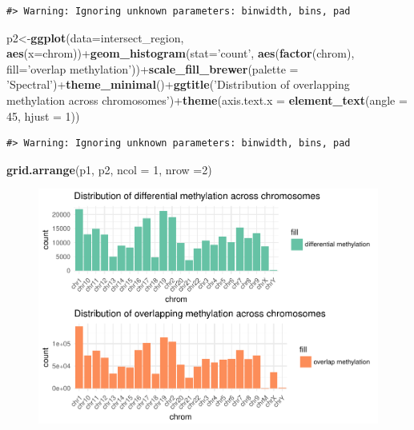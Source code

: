 \documentclass[9pt,a4paper]{extarticle}
\renewcommand{\KeywordTok}[1]{\textbf{{#1}}}
\renewcommand{\DataTypeTok}[1]{\textcolor[rgb]{0.50,0.00,0.00}{{#1}}}
\renewcommand{\DecValTok}[1]{\textcolor[rgb]{0.00,0.00,1.00}{{#1}}}
\renewcommand{\StringTok}[1]{\textcolor[rgb]{0.87,0.00,0.00}{{#1}}}
\renewcommand{\NormalTok}[1]{{#1}}
\begin{document}
\begin{verbatim}
#> Warning: Ignoring unknown parameters: binwidth, bins, pad
\end{verbatim}

\begin{Shaded}
\begin{Highlighting}[]
\NormalTok{p2<-}\KeywordTok{ggplot}\NormalTok{(}\DataTypeTok{data=}\NormalTok{intersect_region, }\KeywordTok{aes}\NormalTok{(}\DataTypeTok{x=}\NormalTok{chrom))+}\KeywordTok{geom_histogram}\NormalTok{(}\DataTypeTok{stat=}\StringTok{'count'}\NormalTok{, }\KeywordTok{aes}\NormalTok{(}\KeywordTok{factor}\NormalTok{(chrom), }\DataTypeTok{fill=}\StringTok{'overlap methylation'}\NormalTok{))+}\KeywordTok{scale_fill_brewer}\NormalTok{(}\DataTypeTok{palette =} \StringTok{'Spectral'}\NormalTok{)+}\KeywordTok{theme_minimal}\NormalTok{()+}\KeywordTok{ggtitle}\NormalTok{(}\StringTok{'Distribution of overlapping methylation across chromosomes'}\NormalTok{)+}\KeywordTok{theme}\NormalTok{(}\DataTypeTok{axis.text.x =} \KeywordTok{element_text}\NormalTok{(}\DataTypeTok{angle =} \DecValTok{45}\NormalTok{, }\DataTypeTok{hjust =} \DecValTok{1}\NormalTok{))}
\end{Highlighting}
\end{Shaded}

\begin{verbatim}
#> Warning: Ignoring unknown parameters: binwidth, bins, pad
\end{verbatim}

\begin{Shaded}
\begin{Highlighting}[]
\KeywordTok{grid.arrange}\NormalTok{(p1, p2, }\DataTypeTok{ncol =} \DecValTok{1}\NormalTok{, }\DataTypeTok{nrow =}\DecValTok{2}\NormalTok{)}
\end{Highlighting}
\end{Shaded}
\begin{figure}
\begin{center}\includegraphics{unnamed-chunk-8-1} \end{center}
\end{figure}
\end{document}
